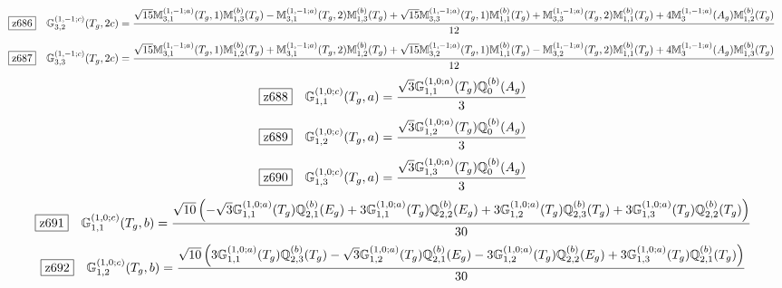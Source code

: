 \documentclass[fleqn,10pt,landscape]{jsarticle}
\begin{document}
\begin{dmath*}
\hspace*{3mm}\fbox{z686}\quad \mathbb{G}_{3,2}^{(1,-1;c)}(T_{g},2c)=\frac{\sqrt{15} \mathbb{M}_{3,1}^{(1,-1;a)}(T_{g},1) \mathbb{M}_{1,3}^{(b)}(T_{g}) - \mathbb{M}_{3,1}^{(1,-1;a)}(T_{g},2) \mathbb{M}_{1,3}^{(b)}(T_{g}) + \sqrt{15} \mathbb{M}_{3,3}^{(1,-1;a)}(T_{g},1) \mathbb{M}_{1,1}^{(b)}(T_{g}) + \mathbb{M}_{3,3}^{(1,-1;a)}(T_{g},2) \mathbb{M}_{1,1}^{(b)}(T_{g}) + 4 \mathbb{M}_{3}^{(1,-1;a)}(A_{g}) \mathbb{M}_{1,2}^{(b)}(T_{g})}{12}
\end{dmath*}
\begin{dmath*}
\hspace*{3mm}\fbox{z687}\quad \mathbb{G}_{3,3}^{(1,-1;c)}(T_{g},2c)=\frac{\sqrt{15} \mathbb{M}_{3,1}^{(1,-1;a)}(T_{g},1) \mathbb{M}_{1,2}^{(b)}(T_{g}) + \mathbb{M}_{3,1}^{(1,-1;a)}(T_{g},2) \mathbb{M}_{1,2}^{(b)}(T_{g}) + \sqrt{15} \mathbb{M}_{3,2}^{(1,-1;a)}(T_{g},1) \mathbb{M}_{1,1}^{(b)}(T_{g}) - \mathbb{M}_{3,2}^{(1,-1;a)}(T_{g},2) \mathbb{M}_{1,1}^{(b)}(T_{g}) + 4 \mathbb{M}_{3}^{(1,-1;a)}(A_{g}) \mathbb{M}_{1,3}^{(b)}(T_{g})}{12}
\end{dmath*}
\begin{dmath*}
\hspace*{3mm}\fbox{z688}\quad \mathbb{G}_{1,1}^{(1,0;c)}(T_{g},a)=\frac{\sqrt{3} \mathbb{G}_{1,1}^{(1,0;a)}(T_{g}) \mathbb{Q}_{0}^{(b)}(A_{g})}{3}
\end{dmath*}
\begin{dmath*}
\hspace*{3mm}\fbox{z689}\quad \mathbb{G}_{1,2}^{(1,0;c)}(T_{g},a)=\frac{\sqrt{3} \mathbb{G}_{1,2}^{(1,0;a)}(T_{g}) \mathbb{Q}_{0}^{(b)}(A_{g})}{3}
\end{dmath*}
\begin{dmath*}
\hspace*{3mm}\fbox{z690}\quad \mathbb{G}_{1,3}^{(1,0;c)}(T_{g},a)=\frac{\sqrt{3} \mathbb{G}_{1,3}^{(1,0;a)}(T_{g}) \mathbb{Q}_{0}^{(b)}(A_{g})}{3}
\end{dmath*}
\begin{dmath*}
\hspace*{3mm}\fbox{z691}\quad \mathbb{G}_{1,1}^{(1,0;c)}(T_{g},b)=\frac{\sqrt{10} \left(- \sqrt{3} \mathbb{G}_{1,1}^{(1,0;a)}(T_{g}) \mathbb{Q}_{2,1}^{(b)}(E_{g}) + 3 \mathbb{G}_{1,1}^{(1,0;a)}(T_{g}) \mathbb{Q}_{2,2}^{(b)}(E_{g}) + 3 \mathbb{G}_{1,2}^{(1,0;a)}(T_{g}) \mathbb{Q}_{2,3}^{(b)}(T_{g}) + 3 \mathbb{G}_{1,3}^{(1,0;a)}(T_{g}) \mathbb{Q}_{2,2}^{(b)}(T_{g})\right)}{30}
\end{dmath*}
\begin{dmath*}
\hspace*{3mm}\fbox{z692}\quad \mathbb{G}_{1,2}^{(1,0;c)}(T_{g},b)=\frac{\sqrt{10} \left(3 \mathbb{G}_{1,1}^{(1,0;a)}(T_{g}) \mathbb{Q}_{2,3}^{(b)}(T_{g}) - \sqrt{3} \mathbb{G}_{1,2}^{(1,0;a)}(T_{g}) \mathbb{Q}_{2,1}^{(b)}(E_{g}) - 3 \mathbb{G}_{1,2}^{(1,0;a)}(T_{g}) \mathbb{Q}_{2,2}^{(b)}(E_{g}) + 3 \mathbb{G}_{1,3}^{(1,0;a)}(T_{g}) \mathbb{Q}_{2,1}^{(b)}(T_{g})\right)}{30}
\end{dmath*}
\end{document}
